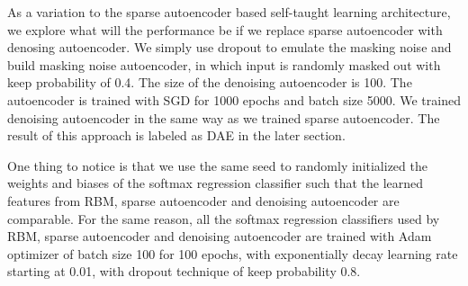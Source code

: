As a variation to the sparse autoencoder based self-taught learning architecture,
we explore what will the performance be if we replace sparse autoencoder with denosing autoencoder.
We simply use dropout to emulate the masking noise and build masking noise autoencoder,
in which input is randomly masked out with keep probability of 0.4.
The size of the denoising autoencoder is 100.
The autoencoder is trained with SGD for 1000 epochs and batch size 5000.
We trained denoising autoencoder in the same way as we trained sparse autoencoder.
The result of this approach is labeled as DAE in the later section.

One thing to notice is that we use the same seed to randomly initialized the weights and biases
of the softmax regression classifier such that the learned features from RBM, sparse autoencoder and
denoising autoencoder are comparable.
For the same reason, all the softmax regression classifiers used by RBM, sparse autoencoder and
denoising autoencoder are trained with Adam optimizer of batch size 100 for 100 epochs,
with exponentially decay learning rate starting at 0.01,
with dropout technique of keep probability 0.8.

